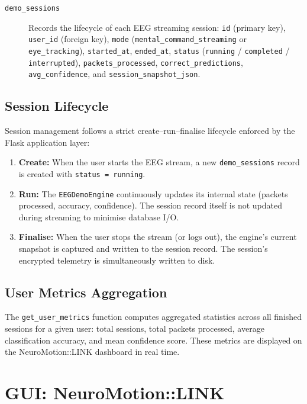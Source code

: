 \documentclass[12pt, a4paper, oneside]{report}
\begin{document}
\begin{description}
\begin{description}
  \item[\texttt{demo\_sessions}] Records the lifecycle of each EEG streaming session:
        \texttt{id} (primary key), \texttt{user\_id} (foreign key), \texttt{mode}
        (\texttt{mental\_command\_streaming} or \texttt{eye\_tracking}),
        \texttt{started\_at}, \texttt{ended\_at}, \texttt{status}
        (\texttt{running} / \texttt{completed} / \texttt{interrupted}),
        \texttt{packets\_processed}, \texttt{correct\_predictions},
        \texttt{avg\_confidence}, and \texttt{session\_snapshot\_json}.
\end{description}

\subsection{Session Lifecycle}

Session management follows a strict create--run--finalise lifecycle enforced by
the Flask application layer:

\begin{enumerate}
  \item \textbf{Create:} When the user starts the EEG stream, a new
        \texttt{demo\_sessions} record is created with \texttt{status = running}.
  \item \textbf{Run:} The \texttt{EEGDemoEngine} continuously updates its internal
        state (packets processed, accuracy, confidence). The session record itself
        is not updated during streaming to minimise database I/O.
  \item \textbf{Finalise:} When the user stops the stream (or logs out), the
        engine's current snapshot is captured and written to the session record.
        The session's encrypted telemetry is simultaneously written to disk.
\end{enumerate}

\subsection{User Metrics Aggregation}

The \texttt{get\_user\_metrics} function computes aggregated statistics across all
finished sessions for a given user: total sessions, total packets processed, average
classification accuracy, and mean confidence score. These metrics are displayed on
the NeuroMotion::LINK dashboard in real time.

\section{GUI: NeuroMotion::LINK}
\label{sec:gui}


\end{description}
\end{document}
